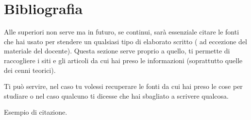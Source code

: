 \section{Bibliografia}
Alle superiori non serve ma in futuro, se continui, sarà essenziale citare le fonti che hai usato per stendere un qualsiasi tipo di elaborato scritto ( ad eccezione del materiale del docente). Questa sezione serve proprio a quello, ti permette di raccogliere i siti e gli articoli da cui hai preso le informazioni (soprattutto quelle dei cenni teorici). 

Ti può servire, nel caso tu volessi recuperare le fonti da cui hai preso le cose per studiare o nel caso qualcuno ti dicesse che hai sbagliato a scrivere qualcosa.

Esempio di citazione.\autocite{einstein}

\printbibliography %